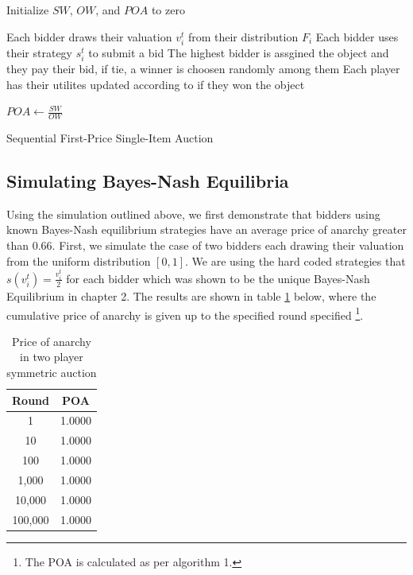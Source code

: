 \documentclass[12pt,twoside]{reedthesis}
\begin{document}
\begin{algorithm}[H]
	Initialize $SW$, $OW$, and $POA$ to zero\\
	{
		Each bidder draws their valuation $v^t_i$ from their distribution $F_i$\;
		Each bidder uses their strategy $s^t_i$ to submit a bid\;
		The highest bidder is assgined the object and they pay their bid, if tie, a winner is choosen randomly among them\;
		Each player has their utilites updated according to if they won the object\;
	
		$POA \leftarrow \frac{SW}{OW}$	
	\caption{Sequential First-Price Single-Item Auction}
	}
\end{algorithm}


\subsection{Simulating Bayes-Nash Equilibria}
Using the simulation outlined above, we first demonstrate that bidders using known Bayes-Nash equilibrium strategies have an average price of anarchy greater than $0.66$. First, we simulate the case of two bidders each drawing their valuation from the uniform distribution $[0,1]$. We are using the hard coded strategies that $s(v^t_i) = \frac{v^t_i}{2}$ for each bidder which was shown to be the unique Bayes-Nash Equilibrium in chapter 2. The results are shown in table \ref{table:1} below, where the cumulative price of anarchy is given up to the specified round specified 
\footnote{The POA is calculated as per algorithm 1. %
}.

\begin{table}[h!]
\begin{center}
\begin{tabular}{ |c|c| }
	\hline
	Round & POA \\
	\hline
	1 & 1.0000 \\
	10 & 1.0000 \\
	100 & 1.0000 \\
	1,000 & 1.0000 \\
	10,000 & 1.0000 \\
	100,000 & 1.0000 \\
	\hline
\end{tabular}
\caption{Price of anarchy in two player symmetric auction}
\label{table:1}
\end{center} 
\end{table}
\end{document}
